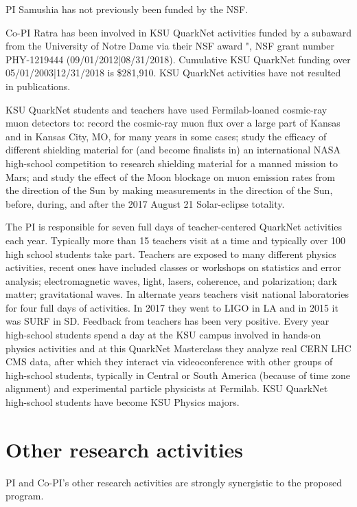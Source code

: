 PI Samushia has not previously been funded by the NSF.

Co-PI Ratra has been involved in  KSU QuarkNet activities funded by a subaward
from the University of Notre Dame via their NSF award \QuarkNet", NSF grant
number PHY-1219444 (09/01/2012|08/31/2018).  Cumulative KSU QuarkNet funding
over 05/01/2003|12/31/2018 is \$281,910. KSU QuarkNet activities have not
resulted in publications. 

KSU QuarkNet students and teachers have used Fermilab-loaned cosmic-ray muon
detectors to: record the cosmic-ray muon flux over a large part of Kansas and
in Kansas City, MO, for many years in some cases; study the efficacy of
different shielding material for (and become finalists in) an international
NASA high-school competition to research shielding material for a manned
mission to Mars; and study the effect of the Moon blockage on muon emission
rates from the direction of the Sun by making measurements in the direction of
the Sun, before, during, and after the 2017 August 21 Solar-eclipse totality.

The PI is responsible for seven full days of teacher-centered QuarkNet
activities each year. Typically more than 15 teachers visit at a time and
typically over 100 high school students take part. Teachers are exposed to many
different physics activities, recent ones have included classes or workshops on
statistics and error analysis; electromagnetic waves, light, lasers, coherence,
and polarization; dark matter; gravitational waves.  In alternate years
teachers visit national laboratories for four full days of activities. In 2017
they went to LIGO in LA and in 2015 it was SURF in SD.  Feedback from teachers
has been very positive. Every year high-school students spend a day at the KSU
campus involved in hands-on physics activities and at this QuarkNet Masterclass
they analyze real CERN LHC CMS data, after which they interact via
videoconference with other groups of high-school students, typically in
Central or South America (because of time zone alignment) and experimental
particle physicists at Fermilab. KSU QuarkNet high-school students have become
KSU Physics majors. 

\section{Other research activities}

PI and Co-PI's other research activities are strongly synergistic to the
proposed program.

